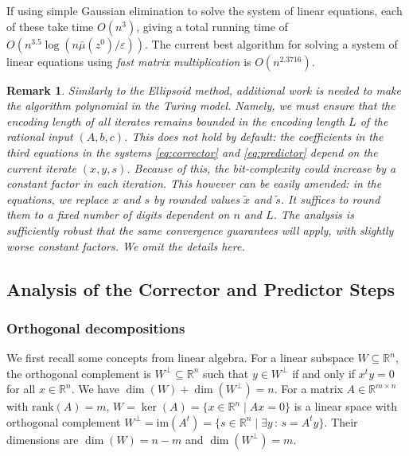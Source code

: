 \documentclass[12pt, showidx, twoside]{article}
\newtheorem{remark}[satz]{Remark}
\def\R{\mathbb{R}}
\def\gap{\bar{\mu}}
\begin{document}
{{{%
If using simple Gaussian elimination to solve the system of linear equations, each of these take time $O(n^3)$, giving a total running time of
 $O(n^{3.5}\log(n\gap(z^0)/\varepsilon))$. The current best algorithm for solving a system of linear equations  using \emph{fast matrix multiplication} is $O(n^{2.3716})$.

\begin{remark} \em Similarly to the Ellipsoid method, additional work is needed to make the algorithm polynomial in the Turing model. Namely, we must ensure that the encoding length of all iterates remains bounded in the encoding length $L$ of the rational input $(A,b,c)$.
This does not hold by default: the coefficients in the third equations in the systems \eqref{eq:corrector} and \eqref{eq:predictor} depend on the current iterate $(x,y,s)$. Because of this, the bit-complexity could increase by a constant factor in each iteration. This however can be easily amended: in the equations, we replace $x$ and $s$ by rounded values $\tilde x$ and $\tilde s$. It suffices to round  them to a fixed number of digits dependent on $n$ and $L$. The analysis is sufficiently robust that the same convergence guarantees will apply, with slightly worse constant factors. We omit the details here.
\end{remark}
\subsection{Analysis of the Corrector and Predictor Steps}\label{sec:IPM-analysis}
\subsubsection{Orthogonal decompositions}
We first recall some concepts from linear algebra. For a linear subspace $W\subseteq \R^n$, the orthogonal complement is $W^\perp\subseteq\R^n$ such that $y\in W^\perp$ if and only if $x^t y=0$ for all $x\in\R^n$. We have $\dim(W)+\dim(W^\perp)=n$.
For a matrix $A\in\R^{m\times n}$ with $\mathrm{rank}(A)=m$,
 $W=\ker(A)=\{x\in\R^n\mid Ax=0 \}$ is a linear space with orthogonal complement $W^\perp=\mathrm{im}(A^t)=\{s\in\R^n\mid \exists y\,:\, s=A^t y\}$. Their dimensions are $\dim(W)=n-m$ and $\dim(W^\perp)=m$.

}}}
\end{document}
